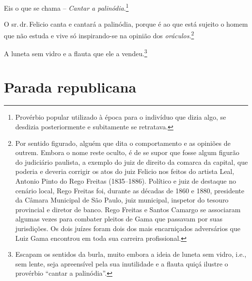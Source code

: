 Eis o que se chama -- \emph{Cantar a palinódia}.\footnote{ Provérbio
  popular utilizado à época para o indivíduo que dizia algo, se desdizia
  posteriormente e subitamente se retratava.}

O sr.\,dr.\,Felicio canta e cantará a palinódia, porque é ao que está
sujeito o homem que não estuda e vive só inspirando-se na opinião dos
\emph{oráculos}.\footnote{ Por sentido figurado, alguém que dita o
  comportamento e as opiniões de outrem. Embora o nome reste oculto, é
  de se supor que fosse algum figurão do judiciário paulista, a exemplo
  do juiz de direito da comarca da capital, que poderia e deveria
  corrigir os atos do juiz Felicio nos feitos do artista Leal, Antonio
  Pinto do Rego Freitas (1835--1886). Político e juiz de destaque no
  cenário local, Rego Freitas foi, durante as décadas de 1860 e 1880,
  presidente da Câmara Municipal de São Paulo, juiz municipal, inspetor
  do tesouro provincial e diretor de banco. Rego Freitas e Santos
  Camargo se associaram algumas vezes para combater pleitos de Gama que
  passavam por suas jurisdições. Os dois juízes foram dois dos mais
  encarniçados adversários que Luiz Gama encontrou em toda sua carreira
  profissional.}

A luneta sem vidro e a flauta que ele a vendeu.\footnote{ Escapam os
  sentidos da burla, muito embora a ideia de luneta sem vidro, i.e., sem
  lente, seja apreensível pela sua inutilidade e a flauta quiçá ilustre
  o provérbio ``cantar a palinódia''.}

\part{Parada republicana}

